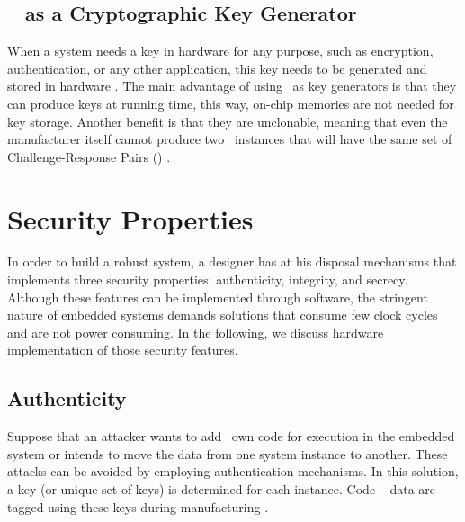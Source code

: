 \subsection{\puf~ as a Cryptographic  Key Generator }
When a system needs a key in hardware for any purpose, such as encryption, authentication, or any other application, this key needs to be generated and stored in hardware \cite{puf-key-devadas-1278484}. The main advantage of using \pufs~as key generators is that they can produce keys at running time, this way, on-chip memories are not needed for key storage. Another benefit is that they are unclonable, meaning that even the manufacturer itself cannot produce two \puf~instances that will have the same set of Challenge-Response Pairs (\crps) \cite{Gassend2002:PUFs}. 


\section{Security Properties}
\label{sec:securityproperties}
In order to build a robust system, a designer has at his disposal mechanisms that implements three security properties: authenticity, integrity, and secrecy. Although these features can be implemented through software, the stringent nature of embedded systems demands solutions that consume few clock cycles and are not power consuming.
In the following, we discuss hardware implementation of those security features.

\subsection{Authenticity}
\label{subsec:Authenticity}
Suppose that an attacker wants to add \hisher~own code for execution in the embedded system or intends to move the data from one system instance to another. These attacks can be avoided by employing authentication mechanisms. In this solution, a key (or unique set of keys) is determined for each instance.
Code \andor~ data are tagged using these keys during manufacturing .  

